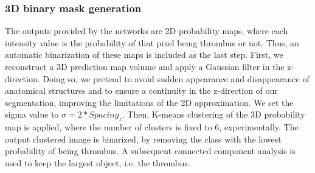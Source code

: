 \documentclass[preprint,authoryear,12pt]{elsarticle}
\begin{document}


\subsubsection*{3D binary mask generation} 
The outputs provided by the networks are 2D probability maps, where each intensity value is the probability of that pixel being thrombus or not. Thus, an automatic binarization of these maps is included as the last step. First, we reconstruct a 3D prediction map volume and apply a Gaussian filter in the z-direction. Doing so, we pretend to avoid sudden appearance and disappearance of anatomical structures and to ensure a continuity in the z-direction of our segmentation, improving the limitations of the 2D approximation. We set the sigma value to \(\sigma = 2*Spacing_{z}\). Then, K-means clustering of the 3D probability map is applied, where the number of clusters is fixed to 6, experimentally. The output clustered image is binarized, by removing the class with the lowest probability of being thrombus. A subsequent connected component analysis is used to keep the largest object, i.e. the thrombus.
\end{document}
